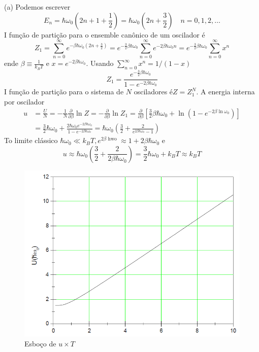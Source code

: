 \begin{enumerate}[start=1,label={\bfseries Q\arabic*.}]
\resposta (a) Podemos escrever
$$
E_{n}=\hbar \omega_{0}\left(2 n+1+\frac{1}{2}\right)=\hbar \omega_{0}\left(2 n+\frac{3}{2}\right) \quad n=0,1,2, \ldots
$$
I função de partição para o ensemble canônico de um oscilador é
$$
Z_{1}=\sum_{n=0}^{\infty} e^{-\beta \hbar \omega_{0}\left(2 n+\frac{3}{2}\right)}=e^{-\frac{3}{2} \beta \hbar \omega_{0}} \sum_{n=0}^{\infty} e^{-2 \beta \hbar \omega_{0} n}=e^{-\frac{3}{2} \beta \hbar \omega_{0}} \sum_{n=0}^{\infty} x^{n}
$$
ende $\beta \equiv \frac{1}{k_{B} T}$ e $x=e^{-2 \beta \hbar \omega_{0}} .$ Usando $\sum_{n=0}^{\infty} x^{n}=1 /(1-x)$
$$
Z_{1}=\frac{e^{-\frac{3}{2} \beta \hbar \omega_{0}}}{1-e^{-2 \beta \hbar \omega_{0}}}
$$
I função de partição para o sistema de $N$ osciladores $é Z=Z_{1}^{N} .$ A energia interna por oscilador
$$
\begin{aligned}
u &=\frac{U}{N}=-\frac{1}{N} \frac{\partial}{\partial \beta} \ln Z=-\frac{\partial}{\partial \beta} \ln Z_{1}=\frac{\partial}{\partial \beta}\left[\frac{3}{2} \beta \hbar \omega_{0}+\ln \left(1-e^{-2 \beta \ln \omega_{0}}\right)\right] \\
&=\frac{3}{2} \hbar \omega_{0}+\frac{2 \hbar \omega_{0} e^{-2 \beta \hbar \omega_{0}}}{1-e^{-2 \beta \hbar \omega_{0}}}=\hbar \omega_{0}\left(\frac{3}{2}+\frac{2}{e^{2 \beta \hbar \omega_{0}}-1}\right)
\end{aligned}
$$
To limite clássico $\hbar \omega_{0} \ll k_{B} T, e^{2 \beta \text { hwo }} \approx 1+2 \beta \hbar \omega_{0}$ e
$$
u \approx \hbar \omega_{0}\left(\frac{3}{2}+\frac{2}{2 \beta \hbar \omega_{0}}\right)=\frac{3}{2} \hbar \omega_{0}+k_{B} T \approx k_{B} T
$$
\begin{figure}[H]
  \centering
  \includegraphics[scale=0.6]{termica-img/osciladores.png}
  \caption{Esboço de $u \times T$}
\end{figure}




\end{enumerate}
